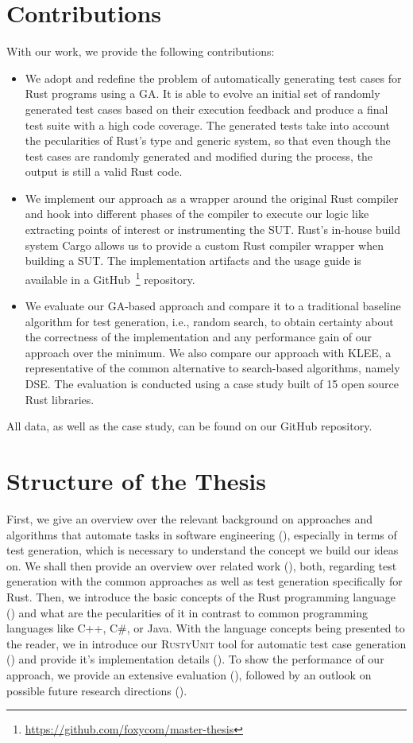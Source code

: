\documentclass[paper=a4,%
  twoside,%
  BCOR4mm,%
  abstract=true,%
  toc=bibliography,%
  chapterprefix=true,%
  toc=bibliographynumbered,%
  open=right,%
  english,%
  pagesize=pdftex]{scrreprt}
\begin{document}
\section{Contributions}
With our work, we provide the following contributions:
\begin{itemize}
  \item We adopt and redefine the problem of automatically generating test cases for Rust programs using a \ac{GA}. It is able to evolve an initial set of randomly generated test cases based on their execution feedback and produce a final test suite with a high code coverage. The generated tests take into account the pecularities of Rust's type and generic system, so that even though the test cases are randomly generated and modified during the process, the output is still a valid Rust code.
  \item We implement our approach as a wrapper around the original Rust compiler and hook into different phases of the compiler to execute our logic like extracting points of interest or instrumenting the \ac{SUT}. Rust's in-house build system Cargo allows us to provide a custom Rust compiler wrapper when building a \ac{SUT}. The implementation artifacts and the usage guide is available in a GitHub~\footnote{\url{https://github.com/foxycom/master-thesis}} repository.
  \item We evaluate our \ac{GA}-based approach and compare it to a traditional baseline algorithm for test generation, i.e., random search, to obtain certainty about the correctness of the implementation and any performance gain of our approach over the minimum. We also compare our approach with KLEE, a representative of the common alternative to search-based algorithms, namely \ac{DSE}. The evaluation is conducted using a case study built of 15 open source Rust libraries.
\end{itemize}
All data, as well as the case study, can be found on our GitHub repository.

\section{Structure of the Thesis}
First, we give an overview over the relevant background on approaches and algorithms that automate tasks in software engineering (), especially in terms of test generation, which is necessary to understand the concept we build our ideas on. We shall then provide an overview over related work (), both, regarding test generation with the common approaches as well as test generation specifically for Rust. Then, we introduce the basic concepts of the Rust programming language () and what are the pecularities of it in contrast to common programming languages like C++, C\#, or Java. With the language concepts being presented to the reader, we in introduce our \textsc{RustyUnit} tool for automatic test case generation () and provide it's implementation details (). To show the performance of our approach, we provide an extensive evaluation (), followed by an outlook on possible future research directions ().
\end{document}
